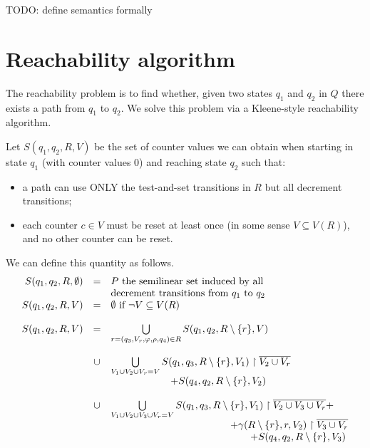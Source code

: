 \documentclass[letterpaper,11pt]{article}
\newcommand{\loris}{\textcolor[rgb]{0.00,0.00,1.00}}
\begin{document}
\loris{TODO: define semantics formally}

\section{Reachability algorithm}
The reachability problem is to find whether, given two states $q_1$ and $q_2$ in $Q$ there exists a path from $q_1$ to $q_2$.
We solve this problem via a Kleene-style reachability algorithm.

Let $S(q_1,q_2,R,V)$ be the set of counter values we can obtain when starting in state $q_1$ (with counter values 0) and reaching state $q_2$ such that:
\begin{itemize}
\item a path can use ONLY the test-and-set transitions in $R$ but all decrement transitions;
\item each counter $c\in V$ must be reset at least once (in some sense $V\subseteq V(R)$), and no other counter can be reset.
\end{itemize}
We can define this quantity as follows.
\[
\begin{array}{rcl}
S(q_1,q_2,R, \emptyset) & = &P\text{ the semilinear set induced by all}\\
&& \text{decrement transitions from }q_1\text{ to  }q_2\\
S(q_1,q_2,R,V) & = &\emptyset\text{ if } \neg V\subseteq V(R)\\
&&\\
S(q_1,q_2,R,V) & = & \bigcup\limits_{r=(q_3,V_r, \varphi, \rho, q_4)\in R} S(q_1,q_2, R\setminus\{r\},V)\\
&&\\
& \cup & \bigcup\limits_{V_1\cup V_2 \cup V_r=V} S(q_1,q_3, R\setminus \{r\}, V_1) \upharpoonright \overline{V_2\cup V_r}\\
&         &  \quad\quad\quad \quad\quad\quad + S(q_4,q_2,R\setminus\{r\}, V_2)\\
&&\\
 & \cup  & \bigcup\limits_{V_1\cup V_2\cup V_3 \cup V_r=V} S(q_1,q_3, R\setminus\{r\},V_1)\upharpoonright \overline{V_2\cup V_3\cup V_r}+\\
&         &  \quad\quad\quad\quad\quad\quad\quad\quad\quad\quad\quad\quad + \gamma(R\setminus \{r\},r,V_2)\upharpoonright \overline{V_3\cup V_r} \\
&         &  \quad\quad\quad\quad\quad\quad\quad\quad\quad\quad\quad\quad\quad\quad  + S(q_4,q_2, R\setminus \{r\},V_3)\\
\end{array}
\]
\end{document}

